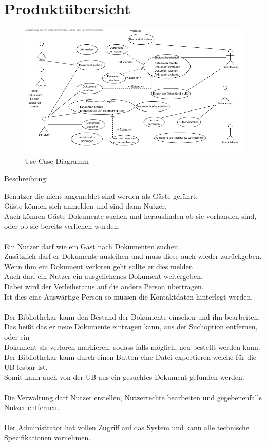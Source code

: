\chapter{Produktübersicht}

\begin{figure}[h]
\centering
\includegraphics[width=0.8\linewidth]{bilder/use-case.png}
\caption[Use-Case-Diagramm]{Use-Case-Diagramm}
\end{figure}


Beschreibung:

Benutzer die nicht angemeldet sind werden als Gäste geführt.\\
Gäste können sich anmelden und sind dann Nutzer. \\
Auch können Gäste Dokumente suchen und herausfinden ob sie vorhanden sind, oder ob sie bereits verliehen wurden.\\
\\
Ein Nutzer darf wie ein Gast nach Dokumenten suchen.\\
Zusätzlich darf er Dokumente ausleihen und muss diese auch wieder zurückgeben.\\
Wenn ihm ein Dokument verloren geht sollte er dies melden.\\
Auch darf ein Nutzer ein ausgeliehenes Dokument weitergeben.\\
Dabei wird der Verleihstatus auf die andere Person übertragen.\\
Ist dies eine Auswärtige Person so müssen die Kontaktdaten hinterlegt werden.\\
\\
Der Bibliothekar kann den Bestand der Dokumente einsehen und ihn bearbeiten.\\
Das heißt das er neue Dokumente eintragen kann, aus der Suchoption entfernen, oder ein\\
Dokument als verloren markieren, sodass falls möglich, neu bestellt werden kann.\\
Der Bibliothekar kann durch einen Button eine Datei exportieren welche für die UB lesbar ist.\\
Somit kann auch von der UB aus ein gesuchtes Dokument gefunden werden.\\
\\
Die Verwaltung darf Nutzer erstellen, Nutzerrechte bearbeiten und gegebenenfalls Nutzer entfernen.\\
\\
Der Administrator hat vollen Zugriff auf das System und kann alle technische Spezifikationen vornehmen.\\